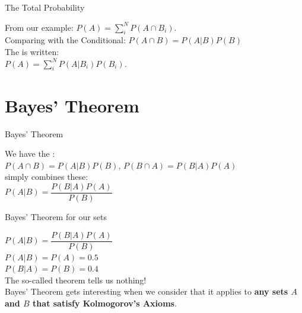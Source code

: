 \documentclass[10pt,sans,english,compress,xcolor=dvipsnames]{beamer}
\begin{document}
\begin{frame}[fragile]{The Total Probability}

From our example: $P(A) = \sum \limits_i^N P(A\cap B_i)$.\\[2ex]
Comparing with the Conditional: $P(A\cap B) = P(A | B) P(B) $\\[4ex]
The  is written:\\[1ex]
 $P(A) = \sum \limits_i^N P(A | B_i) P(B_i)$.\\[3ex]
 
\end{frame} 




\section*{Bayes' Theorem}

\begin{frame}[fragile]{Bayes' Theorem}

We have the :\\[2ex]
$P(A\cap B) = P(A | B) P(B)$,     $P(B\cap A) = P(B | A) P(A)$\\[4ex]
 simply combines these: \\[2ex]%
\center
$P(A | B) = 
\dfrac{
P(B|A)P(A)
}
{
P(B)
}
$\\[1ex]
\end{frame} 

\begin{frame}[fragile]{Bayes' Theorem for our sets}

$P(A | B) = 
\dfrac{
P(B|A)P(A)
}
{
P(B)
}
$\\[1ex]

$P(A| B) = P(A) = 0.5$\\
$P(B| A) = P(B) = 0.4$\\[3ex]
The so-called theorem tells us nothing! \frownie{} \\[1ex]


Bayes' Theorem gets interesting when we consider that it applies to \textbf{any sets $A$ and $B$ that satisfy Kolmogorov's Axioms}.\\[2ex]



\end{frame} 
\end{document}
